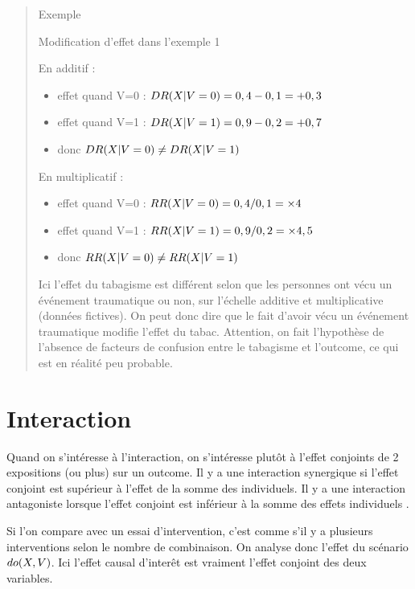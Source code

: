 \documentclass[
]{book}
\providecommand{\tightlist}{%
  \setlength{\itemsep}{0pt}\setlength{\parskip}{0pt}}
\begin{document}
\begin{quote}
Exemple

Modification d'effet dans l'exemple 1

En additif :

\begin{itemize}
\tightlist
\item
  effet quand V=0 : \(\small DR (X | V=0) = 0,4 - 0,1 = +0,3\)
\item
  effet quand V=1 : \(\small DR (X | V=1) = 0,9 - 0,2 = +0,7\)
\item
  donc \(\small DR (X | V=0) \neq DR (X | V=1)\)
\end{itemize}

En multiplicatif :

\begin{itemize}
\tightlist
\item
  effet quand V=0 : \(\small RR(X | V=0) = 0,4/0,1 = \times 4\)
\item
  effet quand V=1 : \(\small RR(X | V=1) = 0,9/0,2 = \times 4,5\)
\item
  donc \(\small RR(X | V=0) \neq RR(X | V=1)\)
\end{itemize}

Ici l'effet du tabagisme est différent selon que les personnes ont vécu un événement traumatique ou non, sur l'échelle additive et multiplicative (données fictives). On peut donc dire que le fait d'avoir vécu un événement traumatique modifie l'effet du tabac. Attention, on fait l'hypothèse de l'absence de facteurs de confusion entre le tabagisme et l'outcome, ce qui est en réalité peu probable.
\end{quote}

\hypertarget{interaction}{%
\section{Interaction}\label{interaction}}

Quand on s'intéresse à l'interaction, on s'intéresse plutôt à l'effet conjoints de 2 expositions (ou plus) sur un outcome. Il y a une interaction synergique si l'effet conjoint est supérieur à l'effet de la somme des individuels. Il y a une interaction antagoniste lorsque l'effet conjoint est inférieur à la somme des effets individuels \citet{corraini_effect_2017}.

Si l'on compare avec un essai d'intervention, c'est comme s'il y a plusieurs interventions selon le nombre de combinaison. On analyse donc l'effet du scénario \(\small do(X, V)\). Ici l'effet causal d'interêt est vraiment l'effet conjoint des deux variables.
\end{document}
